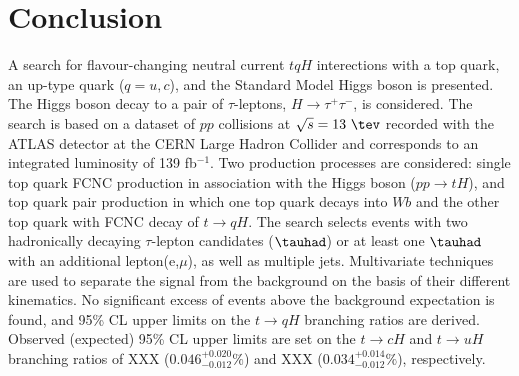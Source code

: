 \section{Conclusion}
\label{sec:conclusion}

A search for flavour-changing neutral current $tqH$ interections with a top quark,	an up-type quark ($q=u, c$), and the
Standard Model Higgs boson is presented. The Higgs boson decay to a pair of $\tau$-leptons, $H\rightarrow \tau^+\tau^-$, is considered.
The search is based on a dataset of $pp$ collisions at $\sqrt{s}=13~\tev$ recorded with the ATLAS detector at the
CERN Large Hadron Collider and corresponds to an integrated luminosity of 139 fb$^{-1}$.
Two production processes are considered:  single top quark FCNC production in association with the Higgs boson ($pp\rightarrow tH$), and top quark pair production in
which one top quark decays into $Wb$ and the other top quark with FCNC decay of $t\rightarrow qH$.
The search selects events with two hadronically decaying $\tau$-lepton candidates ($\tauhad$) or at least one $\tauhad$ with an additional lepton(e,$\mu$),
as well as multiple jets.
Multivariate techniques are used to separate the signal from the background on the basis of their different kinematics.
No significant excess of events above the background expectation is found, and 95\% CL upper limits on the $t\to qH$ branching ratios are derived.
Observed (expected) 95\% CL upper limits are set on the $t\to cH$ and $t\to uH$ branching ratios of XXX ($0.046^{+0.020}_{-0.012}\%$)
and XXX ($0.034^{+0.014}_{-0.012}\%$), respectively.
